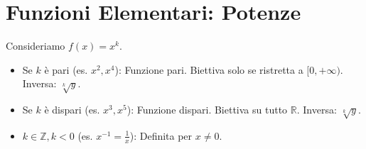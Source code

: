 \documentclass{article}
\begin{document}
\section*{Funzioni Elementari: Potenze}
Consideriamo $f(x) = x^k$.
\begin{itemize}
    \item Se $k$ è pari (es. $x^2, x^4$): Funzione pari. Biettiva solo se ristretta a $[0, +\infty)$. Inversa: $\sqrt[k]{y}$.
    \item Se $k$ è dispari (es. $x^3, x^5$): Funzione dispari. Biettiva su tutto $\mathbb{R}$. Inversa: $\sqrt[k]{y}$.
    \item $k \in \mathbb{Z}, k < 0$ (es. $x^{-1} = \frac{1}{x}$): Definita per $x \neq 0$.
\end{itemize}
\end{document}
